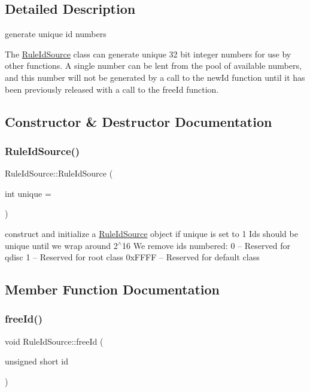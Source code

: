 \subsection{Detailed Description}
generate unique id numbers 

The \hyperlink{classRuleIdSource}{Rule\+Id\+Source} class can generate unique 32 bit integer numbers for use by other functions. A single number can be lent from the pool of available numbers, and this number will not be generated by a call to the new\+Id function until it has been previously released with a call to the free\+Id function. 

\subsection{Constructor \& Destructor Documentation}
\mbox{\label{classRuleIdSource_aae6bfb7f53dc67d7a2700736c330c443}} 
\subsubsection{\texorpdfstring{Rule\+Id\+Source()}{RuleIdSource()}}
{\footnotesize\ttfamily Rule\+Id\+Source\+::\+Rule\+Id\+Source (\begin{DoxyParamCaption}\item[{int}]{unique = {} }\end{DoxyParamCaption})}

construct and initialize a \hyperlink{classRuleIdSource}{Rule\+Id\+Source} object if unique is set to 1 Ids should be unique until we wrap around 2$^\wedge$16 We remove ids numbered\+: 0 -- Reserved for qdisc 1 -- Reserved for root class 0x\+F\+F\+FF -- Reserved for default class 

\subsection{Member Function Documentation}
\mbox{\label{classRuleIdSource_a81879127eea335cb4722c42915e4712e}} 
\subsubsection{\texorpdfstring{free\+Id()}{freeId()}}
{\footnotesize\ttfamily void Rule\+Id\+Source\+::free\+Id (\begin{DoxyParamCaption}\item[{unsigned short}]{id }\end{DoxyParamCaption})}



